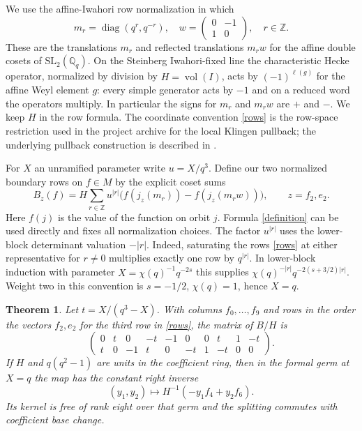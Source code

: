\documentclass[11pt]{article}
\newtheorem{theorem}{Theorem}
\begin{document}
We use the affine-Iwahori row normalization in which
\[
 m_r=\operatorname{diag}(q^r,q^{-r}),\quad
 w=\begin{pmatrix}0&-1\\1&0\end{pmatrix},
 \quad r\in\mathbb Z.
\]
These are the translations $m_r$ and reflected translations $m_rw$
for the affine double cosets of $\mathrm{SL}_2(\mathbb Q_q)$.
On the Steinberg Iwahori-fixed line the characteristic Hecke operator,
normalized by division by $H=\operatorname{vol}(I)$, acts by
$(-1)^{\ell(g)}$ for the affine Weyl element $g$: every simple
generator acts by $-1$ and on a reduced word the operators multiply.
In particular the signs for $m_r$ and $m_rw$ are $+$ and $-$.
We keep $H$ in the row formula. The coordinate convention
\eqref{rows} is the row-space restriction used in the project archive
for the local Klingen pullback; the underlying pullback construction
is described in \cite[Section~11]{SU}.

For $X$ an unramified parameter write $u=X/q^3$. Define our two
normalized boundary rows on $f\in M$ by the explicit coset sums
\begin{equation}\label{definition}
 B_z(f)=H\sum_{r\in\mathbb Z}u^{|r|}
       \bigl(f(j_z(m_r))-f(j_z(m_rw))\bigr),
       \qquad z=f_2,e_2 .
\end{equation}
Here $f(j)$ is the value of the function on orbit $j$. Formula
\eqref{definition} can be used directly and fixes all normalization
choices. The factor $u^{|r|}$ uses the lower-block determinant
valuation $-|r|$. Indeed, saturating the rows \eqref{rows} at either
representative for $r\ne0$ multiplies exactly one row by $q^{|r|}$.
In lower-block induction with parameter
$X=\chi(q)^{-1}q^{-2s}$ this supplies
$\chi(q)^{-|r|}q^{-2(s+3/2)|r|}$. Weight two in this convention is
$s=-1/2$, $\chi(q)=1$, hence $X=q$.

\begin{theorem}
Let $t=X/(q^3-X)$. With columns $f_0,\ldots,f_9$ and rows in
the order the vectors $f_2,e_2$ for the third row in \eqref{rows}, the
matrix of $B/H$ is
\[
\begin{pmatrix}
0&t&0&-t&-1&0&0&t&1&-t\\
t&0&-1&t&0&-t&1&-t&0&0
\end{pmatrix}.
\]
If $H$ and $q(q^2-1)$ are units in the coefficient ring, then in
the formal germ at $X=q$ the map has the constant right inverse
\[
 (y_1,y_2)\longmapsto H^{-1}(-y_1 f_4+y_2 f_6).
\]
Its kernel is free of rank eight over that germ and the splitting
commutes with coefficient base change.
\end{theorem}
\end{document}
